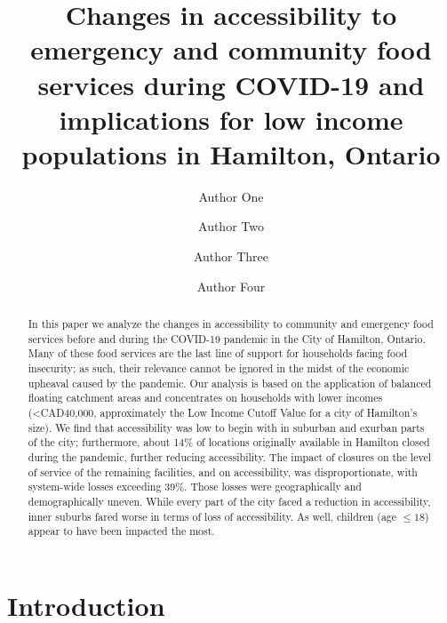 \documentclass[]{elsarticle} %
\begin{document}
\begin{frontmatter}

  \title{Changes in accessibility to emergency and community food
services during COVID-19 and implications for low income populations in
Hamilton, Ontario}
    \author[Some University]{Author One}
    \author[Another University]{Author Two}
    \author[Some University]{Author Three}
    \author[Some University]{Author Four}
      \address[Some University]{Department, Street, City, State, Zip}
    \address[Another University]{Department, Street, City, State, Zip}
  
  \begin{abstract}
  In this paper we analyze the changes in accessibility to community and
  emergency food services before and during the COVID-19 pandemic in the
  City of Hamilton, Ontario. Many of these food services are the last
  line of support for households facing food insecurity; as such, their
  relevance cannot be ignored in the midst of the economic upheaval
  caused by the pandemic. Our analysis is based on the application of
  balanced floating catchment areas and concentrates on households with
  lower incomes (\textless CAD40,000, approximately the Low Income
  Cutoff Value for a city of Hamilton's size). We find that
  accessibility was low to begin with in suburban and exurban parts of
  the city; furthermore, about 14\% of locations originally available in
  Hamilton closed during the pandemic, further reducing accessibility.
  The impact of closures on the level of service of the remaining
  facilities, and on accessibility, was disproportionate, with
  system-wide losses exceeding 39\%. Those losses were geographically
  and demographically uneven. While every part of the city faced a
  reduction in accessibility, inner suburbs fared worse in terms of loss
  of accessibility. As well, children (age \(\le 18\)) appear to have
  been impacted the most.
  \end{abstract}
  
 \end{frontmatter}

\hypertarget{introduction}{%
\section{Introduction}\label{introduction}}
\end{document}
